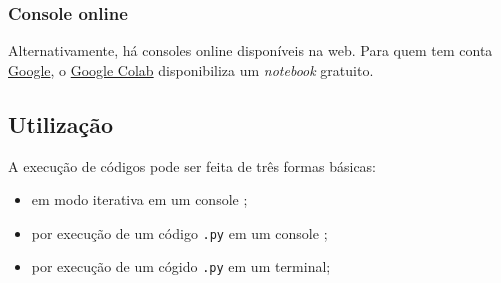 \documentclass[12pt]{article}
\begin{document}
\subsubsection{Console online}

Alternativamente, há consoles online {\python} disponíveis na web. Para quem tem conta \href{https://www.google.com}{Google}, o \href{https://colab.research.google.com}{Google Colab} disponibiliza um \emph{notebook} {\python} gratuito. 

\subsection{Utilização}

A execução de códigos \python pode ser feita de três formas básicas:
\begin{itemize}
\item em modo iterativa em um console \python;
\item por execução de um código \verb+.py+ em um console \python;
\item por execução de um cógido \verb+.py+ em um terminal;
\end{itemize}
\end{document}
